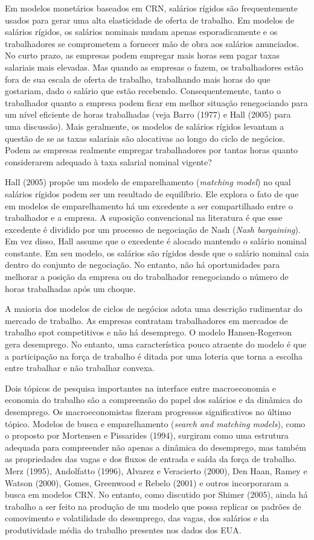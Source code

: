 \documentclass[12pt]{article}
\begin{document}
Em modelos monetários baseados em CRN, salários rígidos são frequentemente usados para gerar uma alta elasticidade de oferta de trabalho. Em modelos de salários rígidos, os salários nominais mudam apenas esporadicamente e os trabalhadores se comprometem a fornecer mão de obra aos salários anunciados. No curto prazo, as empresas podem empregar mais horas sem pagar taxas salariais mais elevadas. Mas quando as empresas o fazem, os trabalhadores estão fora de sua escala de oferta de trabalho, trabalhando mais horas do que gostariam, dado o salário que estão recebendo. Consequentemente, tanto o trabalhador quanto a empresa podem ficar em melhor situação renegociando para um nível eficiente de horas trabalhadas (veja Barro (1977) e Hall (2005) para uma discussão). Mais geralmente, os modelos de salários rígidos levantam a questão de se as taxas salariais são alocativas ao longo do ciclo de negócios. Podem as empresas realmente empregar trabalhadores por tantas horas quanto considerarem adequado à taxa salarial nominal vigente?

Hall (2005) propõe um modelo de emparelhamento (\textit{matching model}) no qual salários rígidos podem ser um resultado de equilíbrio. Ele explora o fato de que em modelos de emparelhamento há um excedente a ser compartilhado entre o trabalhador e a empresa. A suposição convencional na literatura é que esse excedente é dividido por um processo de negociação de Nash (\textit{Nash bargaining}). Em vez disso, Hall assume que o excedente é alocado mantendo o salário nominal constante. Em seu modelo, os salários são rígidos desde que o salário nominal caia dentro do conjunto de negociação. No entanto, não há oportunidades para melhorar a posição da empresa ou do trabalhador renegociando o número de horas trabalhadas após um choque.

A maioria dos modelos de ciclos de negócios adota uma descrição rudimentar do mercado de trabalho. As empresas contratam trabalhadores em mercados de trabalho spot competitivos e não há desemprego. O modelo Hansen-Rogerson gera desemprego. No entanto, uma característica pouco atraente do modelo é que a participação na força de trabalho é ditada por uma loteria que torna a escolha entre trabalhar e não trabalhar convexa.

Dois tópicos de pesquisa importantes na interface entre macroeconomia e economia do trabalho são a compreensão do papel dos salários e da dinâmica do desemprego. Os macroeconomistas fizeram progressos significativos no último tópico. Modelos de busca e emparelhamento (\textit{search and matching models}), como o proposto por Mortensen e Pissarides (1994), surgiram como uma estrutura adequada para compreender não apenas a dinâmica do desemprego, mas também as propriedades das vagas e dos fluxos de entrada e saída da força de trabalho. Merz (1995), Andolfatto (1996), Alvarez e Veracierto (2000), Den Haan, Ramey e Watson (2000), Gomes, Greenwood e Rebelo (2001) e outros incorporaram a busca em modelos CRN. No entanto, como discutido por Shimer (2005), ainda há trabalho a ser feito na produção de um modelo que possa replicar os padrões de comovimento e volatilidade do desemprego, das vagas, dos salários e da produtividade média do trabalho presentes nos dados dos EUA.
\end{document}
